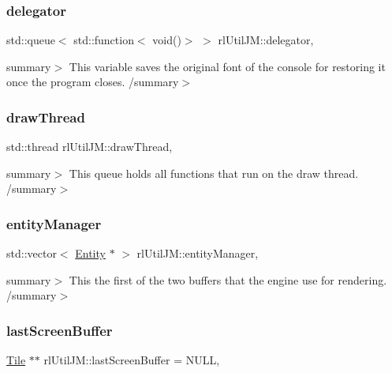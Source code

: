 \subsubsection{\texorpdfstring{delegator}{delegator}}
{\footnotesize\ttfamily std\+::queue$<$ std\+::function$<$ void()$>$ $>$ rl\+Util\+J\+M\+::delegator\hspace{0.3cm}{\ttfamily [static]}, {\ttfamily [private]}}

summary$>$ This variable saves the original font of the console for restoring it once the program closes. /summary$>$ \mbox{\label{classrl_util_j_m_a4ea8d5da372d2fee4641e0bddcdb9133}} 
\subsubsection{\texorpdfstring{draw\+Thread}{drawThread}}
{\footnotesize\ttfamily std\+::thread rl\+Util\+J\+M\+::draw\+Thread\hspace{0.3cm}{\ttfamily [static]}, {\ttfamily [private]}}

summary$>$ This queue holds all functions that run on the draw thread. /summary$>$ \mbox{\label{classrl_util_j_m_a295dbb06816363aeec0c42b1435d56cb}} 
\subsubsection{\texorpdfstring{entity\+Manager}{entityManager}}
{\footnotesize\ttfamily std\+::vector$<$ \hyperlink{class_entity}{Entity} $\ast$ $>$ rl\+Util\+J\+M\+::entity\+Manager\hspace{0.3cm}{\ttfamily [static]}, {\ttfamily [private]}}

summary$>$ This the first of the two buffers that the engine use for rendering. /summary$>$ \mbox{\label{classrl_util_j_m_a59c68887fde5d301a6f6520049a622d8}} 
\subsubsection{\texorpdfstring{last\+Screen\+Buffer}{lastScreenBuffer}}
{\footnotesize\ttfamily \hyperlink{class_tile}{Tile} $\ast$$\ast$ rl\+Util\+J\+M\+::last\+Screen\+Buffer = N\+U\+LL\hspace{0.3cm}{\ttfamily [static]}, {\ttfamily [private]}}

